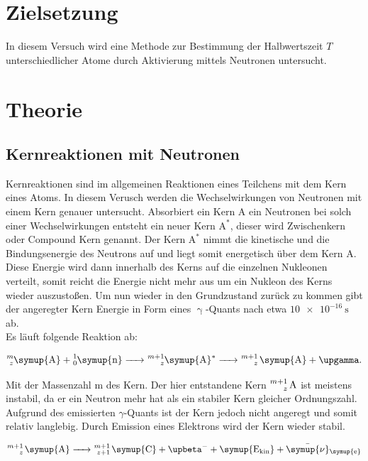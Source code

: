 \section{Zielsetzung}

\noindent In diesem Versuch wird eine Methode zur Bestimmung der Halbwertszeit $T$ unterschiedlicher Atome durch Aktivierung mittels Neutronen untersucht.

\section{Theorie}

\subsection{Kernreaktionen mit Neutronen}

\noindent Kernreaktionen sind im allgemeinen Reaktionen eines Teilchens mit dem Kern eines Atoms. In diesem Verusch werden die Wechselwirkungen 
von Neutronen mit einem Kern genauer untersucht. Absorbiert ein Kern A ein Neutronen bei solch einer Wechselwirkungen entsteht ein neuer Kern
$\text{A}^{\ast}$, dieser wird Zwischenkern oder Compound Kern genannt. Der Kern $\text{A}^{\ast}$ nimmt die kinetische und die Bindungsenergie 
des Neutrons auf und liegt somit energetisch über dem Kern A. Diese Energie wird dann innerhalb des Kerns auf die einzelnen Nukleonen verteilt, 
somit reicht die Energie nicht mehr aus um ein Nukleon des Kerns wieder auszustoßen. Um nun wieder in den Grundzustand zurück zu kommen gibt der 
angeregter Kern Energie in Form eines $\upgamma$-Quants nach etwa $\SI{10e-16}{\second}$ ab.\\
Es läuft folgende Reaktion ab:

\begin{equation*}
   \ce{^m_z\symup{A} + ^1_0\symup{n} -> ^{m+1}_z\symup{A}^{\ast} -> ^{m+1}_z \symup{A} + \upgamma }. \nonumber
\end{equation*}

\noindent Mit der Massenzahl m des Kern. Der hier entstandene Kern $\ce{^{m+1}_z \text{A}}$ ist meistens instabil, da er ein Neutron mehr hat als ein 
stabiler Kern gleicher Ordnungszahl. Aufgrund des emissierten $\gamma$-Quants ist der Kern jedoch nicht angeregt und somit relativ langlebig.
Durch Emission eines Elektrons wird der Kern wieder stabil.

\begin{equation*}
   \ce{^{m+1}_z \symup{A} -> ^{m+1}_{z+1} \symup{C} + \upbeta^- + \symup{E_{kin}} + \bar{\symup{\nu}}_{\symup{e}}} \nonumber
\end{equation*}

